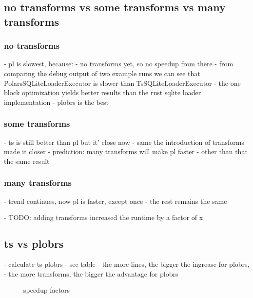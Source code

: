 \subsection{no transforms vs some transforms vs many transforms}
\subsubsection{no transforms}
- pl is slowest, because:
- no transforms yet, so no speedup from there
- from comparing the debug output of two example runs we can see that PolarsSQLiteLoaderExecutor is slower than TsSQLiteLoaderExecutor %
- the one block optimization yields better results than the rust sqlite loader implementation
- plobrs is the best

\subsubsection{some transforms}
- ts is still better than pl but it' close now
- same the introduction of transforms made it closer
- prediction: many transforms will make pl faster
- other than that the same result

\subsubsection{many transforms}
- trend continues, now pl is faster, except once
- the rest remains the same

- TODO: adding transforms increased the runtime by a factor of x

\subsection{ts vs plobrs}
- calculate ts \/ plobrs
- see table
- the more lines, the bigger the ingrease for plobrs,
- the more transforms, the bigger the advantage for plobrs

\begin{figure}
	\caption{speedup factors}\label{fig:plot:factor}
\end{figure}








